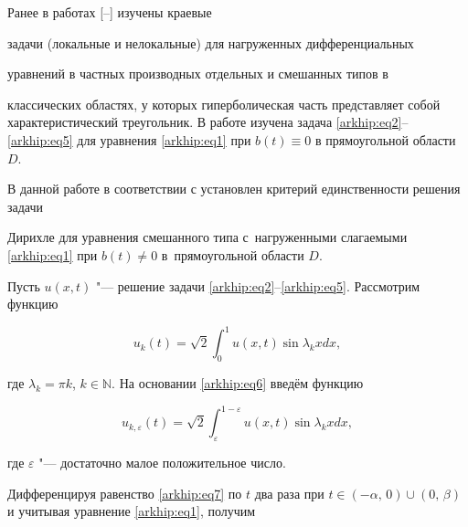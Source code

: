 Ранее в работах [--] изучены краевые

задачи (локальные и нелокальные) для нагруженных дифференциальных

уравнений в частных производных отдельных и смешанных типов в

классических областях, у которых гиперболическая часть представляет собой характеристический треугольник. В работе \cite{arh:11} изучена задача \eqref{arkhip:eq2}--\eqref{arkhip:eq5} для уравнения  \eqref{arkhip:eq1} при $b(t)\equiv 0$ в прямоугольной области $D$.



В данной работе в соответствии с \cite{arh:1, arh:2, arh:11} установлен критерий единственности решения задачи

Дирихле для уравнения смешанного типа с~нагруженными слагаемыми \eqref{arkhip:eq1} при $b(t)\ne 0$ в~прямоугольной области $D$.





\smallskip



 Пусть $u(x, t)$ "--- решение задачи \eqref{arkhip:eq2}--\eqref{arkhip:eq5}. Рассмотрим функцию

\begin{equation}

\label{arkhip:eq6} u_{k}(t)= \sqrt{2}\int_0^1 u (x, t)\sin {\lambda_{k}x}dx,

\end{equation}

где $\lambda_{k} = \pi k$, $k\in \mathbb N$. На основании \eqref{arkhip:eq6} введём функцию

\begin{equation} 

\label{arkhip:eq7} u_{k,\varepsilon}(t)= \sqrt{2}\int_\varepsilon^{1-\varepsilon} u (x, t)\sin {\lambda_{k}x}dx,

\end{equation}

где $\varepsilon$ "--- достаточно малое положительное число. 

Дифференцируя  равенство \eqref{arkhip:eq7} по $t$ два раза при $t\in (-\alpha,\,0)\cup(0,\,\beta)$ и учитывая уравнение \eqref{arkhip:eq1}, получим

